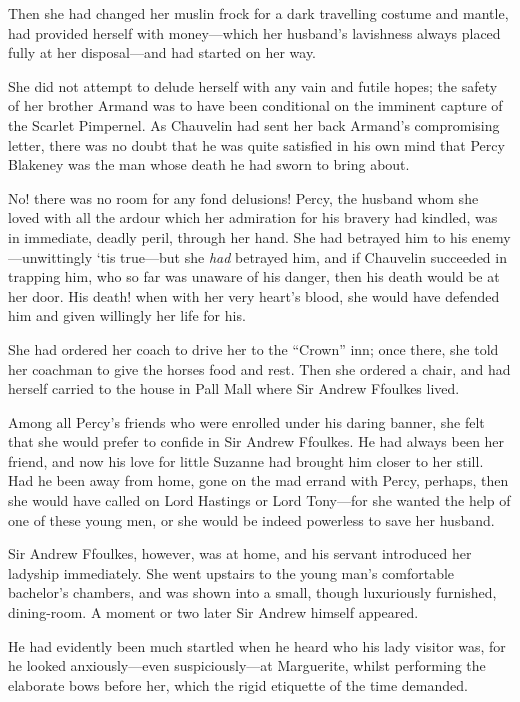 \documentclass[paper=5.5in:8.5in,BCOR=7mm,twoside,DIV=calc,12pt,usegeometry,chapterprefix,endperiod,headings=big]{scrbook}
\begin{document}
Then she had changed her muslin frock for a dark travelling costume and mantle, had provided herself with money---which her husband's lavishness always placed fully at her disposal---and had started on her way.

She did not attempt to delude herself with any vain and futile hopes; the safety of her brother Armand was to have been conditional on the imminent capture of the Scarlet Pimpernel. As Chauvelin had sent her back Armand's compromising letter, there was no doubt that he was quite satisfied in his own mind that Percy Blakeney was the man whose death he had sworn to bring about.

No! there was no room for any fond delusions! Percy, the husband whom she loved with all the ardour which her admiration for his bravery had kindled, was in immediate, deadly peril, through her hand. She had betrayed him to his enemy---unwittingly `tis true---but she \textit{had} betrayed him, and if Chauvelin succeeded in trapping him, who so far was unaware of his danger, then his death would be at her door. His death! when with her very heart's blood, she would have defended him and given willingly her life for his.

She had ordered her coach to drive her to the \enquote{Crown} inn; once there, she told her coachman to give the horses food and rest. Then she ordered a chair, and had herself carried to the house in Pall Mall where Sir Andrew Ffoulkes lived.

Among all Percy's friends who were enrolled under his daring banner, she felt that she would prefer to confide in Sir Andrew Ffoulkes. He had always been her friend, and now his love for little Suzanne had brought him closer to her still. Had he been away from home, gone on the mad errand with Percy, perhaps, then she would have called on Lord Hastings or Lord Tony---for she wanted the help of one of these young men, or she would be indeed powerless to save her husband.

Sir Andrew Ffoulkes, however, was at home, and his servant introduced her ladyship immediately. She went upstairs to the young man's comfortable bachelor's chambers, and was shown into a small, though luxuriously furnished, dining-room. A moment or two later Sir Andrew himself appeared.

He had evidently been much startled when he heard who his lady visitor was, for he looked anxiously---even suspiciously---at Marguerite, whilst performing the elaborate bows before her, which the rigid etiquette of the time demanded.
\end{document}
